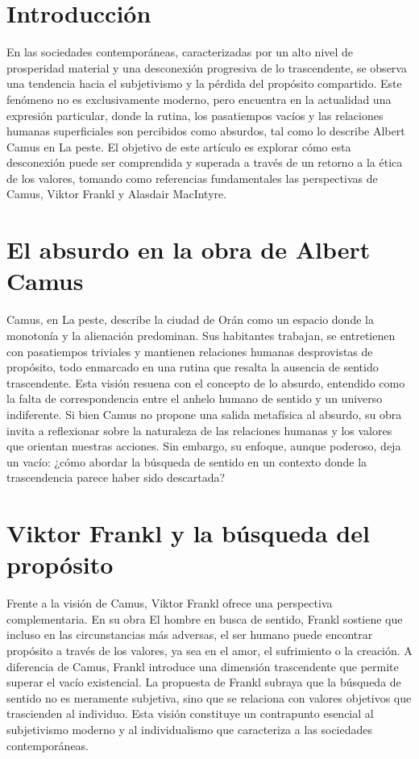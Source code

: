\documentclass[]{article}
\begin{document}
\section{Introducción}
En las sociedades contemporáneas, caracterizadas por un alto nivel de prosperidad material y una desconexión progresiva de lo trascendente, se observa una tendencia hacia el subjetivismo y la pérdida del propósito compartido. Este fenómeno no es exclusivamente moderno, pero encuentra en la actualidad una expresión particular, donde la rutina, los pasatiempos vacíos y las relaciones humanas superficiales son percibidos como absurdos, tal como lo describe Albert Camus en La peste.
El objetivo de este artículo es explorar cómo esta desconexión puede ser comprendida y superada a través de un retorno a la ética de los valores, tomando como referencias fundamentales las perspectivas de Camus, Viktor Frankl y Alasdair MacIntyre.
\section{El absurdo en la obra de Albert Camus}
Camus, en La peste, describe la ciudad de Orán como un espacio donde la monotonía y la alienación predominan. Sus habitantes trabajan, se entretienen con pasatiempos triviales y mantienen relaciones humanas desprovistas de propósito, todo enmarcado en una rutina que resalta la ausencia de sentido trascendente. Esta visión resuena con el concepto de lo absurdo, entendido como la falta de correspondencia entre el anhelo humano de sentido y un universo indiferente.
Si bien Camus no propone una salida metafísica al absurdo, su obra invita a reflexionar sobre la naturaleza de las relaciones humanas y los valores que orientan nuestras acciones. Sin embargo, su enfoque, aunque poderoso, deja un vacío: ¿cómo abordar la búsqueda de sentido en un contexto donde la trascendencia parece haber sido descartada?
\section{Viktor Frankl y la búsqueda del propósito}
Frente a la visión de Camus, Viktor Frankl ofrece una perspectiva complementaria. En su obra El hombre en busca de sentido, Frankl sostiene que incluso en las circunstancias más adversas, el ser humano puede encontrar propósito a través de los valores, ya sea en el amor, el sufrimiento o la creación. A diferencia de Camus, Frankl introduce una dimensión trascendente que permite superar el vacío existencial.
La propuesta de Frankl subraya que la búsqueda de sentido no es meramente subjetiva, sino que se relaciona con valores objetivos que trascienden al individuo. Esta visión constituye un contrapunto esencial al subjetivismo moderno y al individualismo que caracteriza a las sociedades contemporáneas.
\end{document}
